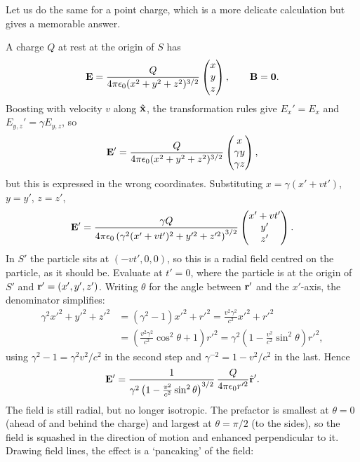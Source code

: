 \documentclass[a4paper]{scrartcl}
\newcommand{\hh}[1]{\hat{\vv{#1}}}
\begin{document}
Let us do the same for a point charge, which is a more delicate calculation but gives a memorable answer.

\begin{example}
	A charge $Q$ at rest at the origin of $S$ has
	$$
	\mathbf{E} = \frac{Q}{4\pi\epsilon_0(x^2+y^2+z^2)^{3/2}}\begin{pmatrix} x\\y\\z\end{pmatrix},\qquad \mathbf{B} = \mathbf{0}.
	$$
	Boosting with velocity $v$ along $\hh{x}$, the transformation rules give $E_x' = E_x$ and $E_{y,z}' = \gamma E_{y,z}$, so
	$$
	\mathbf{E}' = \frac{Q}{4\pi\epsilon_0(x^2+y^2+z^2)^{3/2}}\begin{pmatrix} x\\ \gamma y\\ \gamma z\end{pmatrix},
	$$
	but this is expressed in the wrong coordinates. Substituting $x = \gamma(x'+vt')$, $y = y'$, $z = z'$,
	$$
	\mathbf{E}' = \frac{\gamma Q}{4\pi\epsilon_0\left(\gamma^2(x'+vt')^2 + y'^2+z'^2\right)^{3/2}}\begin{pmatrix} x'+vt'\\ y'\\ z'\end{pmatrix}.
	$$
	In $S'$ the particle sits at $(-vt', 0,0)$, so this is a radial field centred on the particle, as it should be. Evaluate at $t' = 0$, where the particle is at the origin of $S'$ and $\mathbf{r}' = (x',y',z')$. Writing $\theta$ for the angle between $\mathbf{r}'$ and the $x'$-axis, the denominator simplifies:
	\begin{align*}
		\gamma^2 x'^2 + y'^2 + z'^2 &= (\gamma^2-1)x'^2 + r'^2 = \frac{v^2\gamma^2}{c^2}x'^2 + r'^2\\
		&= \left(\frac{v^2\gamma^2}{c^2}\cos^2\theta + 1\right)r'^2 = \gamma^2\left(1 - \frac{v^2}{c^2}\sin^2\theta\right)r'^2,
	\end{align*}
	using $\gamma^2 - 1 = \gamma^2v^2/c^2$ in the second step and $\gamma^{-2} = 1-v^2/c^2$ in the last. Hence
	$$
	\vv{E}' = \frac{1}{\gamma^2\left(1-\frac{v^2}{c^2}\sin^2\theta\right)^{3/2}}\,\frac{Q}{4\pi\epsilon_0 r'^2}\hh{r}'.
	$$
	The field is still radial, but no longer isotropic. The prefactor is smallest at $\theta = 0$ (ahead of and behind the charge) and largest at $\theta = \pi/2$ (to the sides), so the field is squashed in the direction of motion and enhanced perpendicular to it. Drawing field lines, the effect is a `pancaking' of the field:


\end{example}
\end{document}
